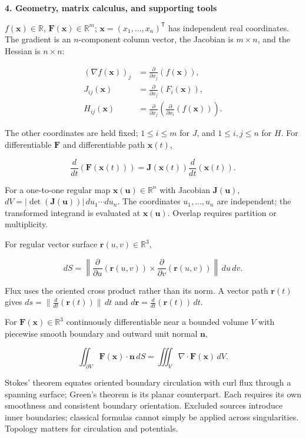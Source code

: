 \documentclass[11pt,oneside,openany]{book}
\begin{document}
\newpage
{\sffamily\large\bfseries 4. Geometry, matrix calculus, and supporting tools\par}\vspace{5pt}
\begin{minipage}[t]{0.485\textwidth}\vspace{0pt}

\(f(\mathbf x)\in\mathbb R\), \(\mathbf F(\mathbf x)\in\mathbb R^m\);
\(\mathbf x=(x_1,\ldots,x_n)^{\mathsf T}\) has independent real coordinates.
The gradient is an \(n\)-component column vector, the Jacobian is \(m\times n\),
and the Hessian is \(n\times n\):

\[
\begin{aligned}
(\nabla f(\mathbf x))_j&=\frac{\partial}{\partial x_j}(f(\mathbf x)),\\
J_{ij}(\mathbf x)&=\frac{\partial}{\partial x_j}(F_i(\mathbf x)),\\
H_{ij}(\mathbf x)&=\frac{\partial}{\partial x_j}
\left(\frac{\partial}{\partial x_i}(f(\mathbf x))\right).
\end{aligned}
\]

The other coordinates are held fixed; \(1\le i\le m\) for \(J\), and
\(1\le i,j\le n\) for \(H\). For differentiable \(\mathbf F\) and differentiable
path \(\mathbf x(t)\),

\[
\frac{d}{dt}(\mathbf F(\mathbf x(t)))
=\mathbf J(\mathbf x(t))\frac{d}{dt}(\mathbf x(t)).
\]


For a one-to-one regular map \(\mathbf x(\mathbf u)\in\mathbb R^n\) with
Jacobian \(\mathbf J(\mathbf u)\), \(dV=|\det(\mathbf J(\mathbf u))|\,du_1\cdots du_n\).
The coordinates \(u_1,\ldots,u_n\) are independent; the transformed integrand is
evaluated at \(\mathbf x(\mathbf u)\). Overlap requires partition or multiplicity.

For regular vector surface \(\mathbf r(u,v)\in\mathbb R^3\),

\[
dS=\left\lVert\frac{\partial}{\partial u}(\mathbf r(u,v))
\times\frac{\partial}{\partial v}(\mathbf r(u,v))\right\rVert\,du\,dv.
\]

Flux uses the oriented cross product rather than its norm. A vector path
\(\mathbf r(t)\) gives \(ds=\lVert\frac{d}{dt}(\mathbf r(t))\rVert\,dt\) and
\(d\mathbf r=\frac{d}{dt}(\mathbf r(t))\,dt\).


For \(\mathbf F(\mathbf x)\in\mathbb R^3\) continuously differentiable near a
bounded volume \(V\) with piecewise smooth boundary and outward unit normal \(\mathbf n\),

\[
\iint_{\partial V}\mathbf F(\mathbf x)\cdot\mathbf n\,dS
=\iiint_V\nabla\cdot\mathbf F(\mathbf x)\,dV.
\]

Stokes' theorem equates oriented boundary circulation with curl flux through
a spanning surface; Green's theorem is its planar counterpart. Each requires
its own smoothness and consistent boundary orientation. Excluded sources
introduce inner boundaries; classical formulas cannot simply be applied across
singularities. Topology matters for circulation and potentials.
\end{minipage}%
\end{document}

